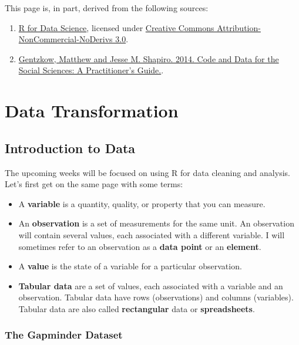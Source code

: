 \documentclass[]{book}
\begin{document}
This page is, in part, derived from the following sources:

\begin{enumerate}
\def\labelenumi{\arabic{enumi}.}
\item
  \href{https://r4ds.had.co.nz}{R for Data Science}, licensed under
  \href{https://creativecommons.org/licenses/by-nc-nd/3.0/us/}{Creative
  Commons Attribution-NonCommercial-NoDerivs 3.0}.
\item
  \href{https://web.stanford.edu/~gentzkow/research/CodeAndData.pdf}{Gentzkow,
  Matthew and Jesse M. Shapiro. 2014. Code and Data for the Social
  Sciences: A Practitioner's Guide.}.
\end{enumerate}

\chapter{Data Transformation}\label{data-transformation}

\section{Introduction to Data}\label{introduction-to-data}

The upcoming weeks will be focused on using R for data cleaning and
analysis. Let's first get on the same page with some terms:

\begin{itemize}
\item
  A \textbf{variable} is a quantity, quality, or property that you can
  measure.
\item
  An \textbf{observation} is a set of measurements for the same unit. An
  observation will contain several values, each associated with a
  different variable. I will sometimes refer to an observation as a
  \textbf{data point} or an \textbf{element}.
\item
  A \textbf{value} is the state of a variable for a particular
  observation.
\item
  \textbf{Tabular data} are a set of values, each associated with a
  variable and an observation. Tabular data have rows (observations) and
  columns (variables). Tabular data are also called \textbf{rectangular}
  data or \textbf{spreadsheets}.
\end{itemize}

\subsection{The Gapminder Dataset}\label{the-gapminder-dataset}
\end{document}

